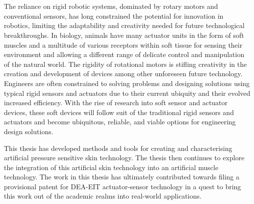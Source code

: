 \chapter{\chapiname}
\label{chapter1}
The reliance on rigid robotic systems, dominated by rotary motors and conventional sensors, has long constrained the potential for innovation in robotics, limiting the adaptability and creativity needed for future technological breakthroughs. In biology, animals have many actuator units in the form of soft muscles and a multitude of various receptors within soft tissue for sensing their environment and allowing a different range of delicate control and manipulation of the natural world. The rigidity of rotational motors is stifling creativity in the creation and development of devices among other unforeseen future technology. Engineers are often constrained to solving problems and designing solutions using typical rigid sensors and actuators due to their current ubiquity and their evolved increased efficiency. With the rise of research into soft sensor and actuator devices, these soft devices will follow suit of the traditional rigid sensors and actuators and become ubiquitous, reliable, and viable options for engineering design solutions. 

This thesis has developed methods and tools for creating and characterising artificial pressure sensitive skin technology. The thesis then continues to explore the integration of this artificial skin technology into an artificial muscle technology. The work in this thesis has ultimately contributed towards filing a provisional patent for DEA-EIT actuator-sensor technology in a quest to bring this work out of the academic realms into real-world applications.



